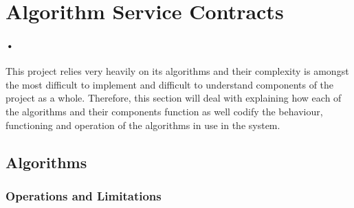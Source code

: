 \documentclass[11pt]{article}
\begin{document}
\section{Algorithm Service Contracts}
\paragraph{•}
This project relies very heavily on its algorithms and their complexity is amongst the most difficult to implement and difficult to understand components of the project as a whole. Therefore, this section will deal with explaining how each of the algorithms and their components function as well codify the behaviour, functioning and operation of the algorithms in use in the system. 
\subsection{Algorithms}
\subsubsection{Operations and Limitations}
\end{document}
